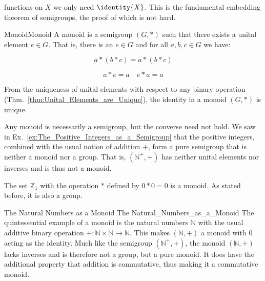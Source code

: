         functions on $X$ we only need $\identity{X}$. This is the fundamental
        embedding theorem of semigroups, the proof of which is not hard.
        \begin{fdefinition}{Monoid}{Monoid}
            A \gls{monoid} is a \gls{semigroup} $(G,*)$ such that there exists a
            \gls{unital element} $e\in{G}$. That is, there is an $e\in{G}$ and
            for all $a,b,c\in{G}$ we have:
            \par\vspace{-2.5ex}
            \begin{minipage}[t]{0.49\textwidth}
                \centering
                \begin{equation}
                    \label{eqn:Monoid_Associativity}
                    a*(b*c)=a*(b*c)\tag{1}
                \end{equation}
            \end{minipage}
            \hfill
            \begin{minipage}[t]{0.49\textwidth}
                \centering
                \begin{equation}
                    \label{eqn:Monoid_Identity}
                    a*e=a\quad
                    e*a=a\tag{2}
                \end{equation}
            \end{minipage}
        \end{fdefinition}
        From the uniqueness of unital elements with respect to any binary
        operation (Thm.~\ref{thm:Unital_Elements_are_Unique}), the identity in a
        monoid $(G,*)$ is unique.
        \begin{example}
            Any monoid is necessarily a semigroup, but the converse need not
            hold. We saw in Ex.~\ref{ex:The_Positive_Integers_as_a_Semigroup}
            that the positive integers, combined with the usual notion of
            addition $+$, form a pure semigroup that is neither a monoid nor a
            group. That is, $(\mathbb{N}^{+},+)$ has neither unital elements nor
            inverses and is thus not a monoid.
        \end{example}
        \begin{example}
            The set $\mathbb{Z}_{1}$ with the operation $*$ defined by $0*0=0$
            is a monoid. As stated before, it is also a group.
        \end{example}
        \begin{fexample}{The Natural Numbers as a Monoid}
                        {The Natural_Numbers_as_a_Monoid}
            The quintessential example of a monoid is the natural numbers
            $\mathbb{N}$ with the usual additive binary operation
            $+:\mathbb{N}\times\mathbb{N}\rightarrow\mathbb{N}$. This makes
            $(\mathbb{N},+)$ a monoid with 0 acting as the identity. Much like
            the semigroup $(\mathbb{N}^{+},+)$, the monoid $(\mathbb{N},+)$
            lacks inverses and is therefore not a group, but a pure monoid. It
            does have the additional property that addition is commutative, thus
            making it a \gls{commutative monoid}.
        \end{fexample}
